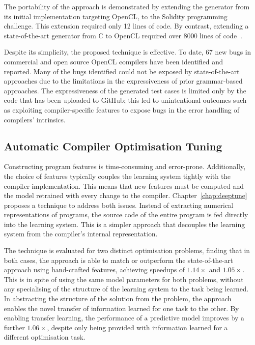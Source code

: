 The portability of the approach is demonstrated by extending the generator from its initial implementation targeting OpenCL, to the Solidity programming challenge. This extension required only 12 lines of code. By contrast, extending a state-of-the-art generator from C to OpenCL required over 8000 lines of code~\cite{Lidbury2015a}.

Despite its simplicity, the proposed technique is effective. To date, 67 new bugs in commercial and open source OpenCL compilers have been identified and reported. Many of the bugs identified could not be exposed by state-of-the-art approaches due to the limitations in the expressiveness of prior grammar-based approaches. The expressiveness of the generated test cases is limited only by the code that has been uploaded to GitHub; this led to unintentional outcomes such as exploiting compiler-specific features to expose bugs in the error handling of compilers' intrinsics. 


\subsection{Automatic Compiler Optimisation Tuning}

 Constructing program features is time-consuming and error-prone. Additionally, the choice of features typically couples the learning system tightly with the compiler implementation. This means that new features must be computed and the model retrained with every change to the compiler. Chapter~\ref{chap:deeptune} proposes a technique to address both issues. Instead of extracting numerical representations of programs, the source code of the entire program is fed directly into the learning system. This is a simpler approach that decouples the learning system from the compiler's internal representation.

The technique is evaluated for two distinct optimisation problems, finding that in both cases, the approach is able to match or outperform the state-of-the-art approach using hand-crafted features, achieving speedups of $1.14\times$ and $1.05\times$. This is in spite of using the same model parameters for both problems, without any specialising of the structure of the learning system to the task being learned. In abstracting the structure of the solution from the problem, the approach enables the novel transfer of information learned for one task to the other. By enabling transfer learning, the performance of a predictive model improves by a further $1.06\times$, despite only being provided with information learned for a different optimisation task.

